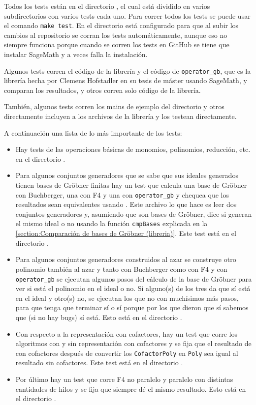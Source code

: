\documentclass[12pt]{report}
\theoremstyle{customstyle}
\theoremstyle{factstyle}
\begin{document}
Todos los tests están en el directorio , el cual está dividido en varios subdirectorios con varios tests cada uno. Para correr todos los tests se puede usar el comando \texttt{make test}. En el directorio  está configurado para que al subir los cambios al repositorio se corran los tests automáticamente, aunque eso no siempre funciona porque cuando se corren los tests en GitHub se tiene que instalar SageMath y a veces falla la instalación.

Algunos tests corren el código de la librería y el código de \texttt{operator\_gb}, que es la librería hecha por Clemens Hofstadler en su tesis de máster \cite{thesis:Hof20} usando SageMath, y comparan los resultados, y otros corren solo código de la librería.

También, algunos tests corren los mains de ejemplo del directorio  y otros directamente incluyen a los archivos de la librería y los testean directamente.

A continuación una lista de lo más importante de los tests:

\begin{itemize}
  \item Hay tests de las operaciones básicas de monomios, polinomios, reducción, etc. en el directorio .
  \item Para algunos conjuntos generadores que se sabe que sus ideales generados tienen bases de Gröbner finitas hay un test que calcula una base de Gröbner con Buchberger, una con F4 y una con \texttt{operator\_gb} y chequea que los resultados sean equivalentes usando . Este archivo lo que hace es leer dos conjuntos generadores y, asumiendo que son bases de Gröbner, dice si generan el mismo ideal o no usando la función \texttt{cmpBases} explicada en la \cref{section:Comparación de bases de Gröbner (libreria)}. Este test está en el directorio .
  \item Para algunos conjuntos generadores construidos al azar se construye otro polinomio también al azar y tanto con Buchberger como con F4 y con \texttt{operator\_gb} se ejecutan algunos pasos del cálculo de la base de Gröbner para ver si está el polinomio en el ideal o no. Si alguno(s) de los tres da que sí está en el ideal y otro(s) no, se ejecutan los que no con muchísimos más pasos, para que tenga que terminar sí o sí porque por los que dieron que sí sabemos que (si no hay bugs) sí está. Esto está en el directorio . %
  \item Con respecto a la representación con cofactores, hay un test que corre los algoritmos con y sin representación con cofactores y se fija que el resultado de con cofactores después de convertir los \texttt{CofactorPoly} en \texttt{Poly} sea igual al resultado sin cofactores. Este test está en el directorio .
  \item Por último hay un test que corre F4 no paralelo y paralelo con distintas cantidades de hilos y se fija que siempre dé el mismo resultado. Esto está en el directorio .
\end{itemize}
\end{document}
